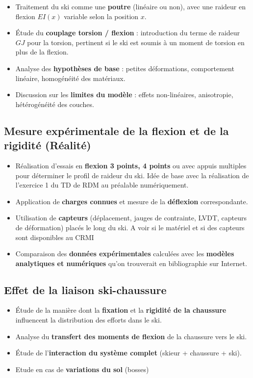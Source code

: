 \documentclass[12pt, a4paper]{article}
\begin{document}
\begin{itemize}
  \item Traitement du ski comme une \textbf{poutre} (linéaire ou non), avec une raideur en flexion $EI(x)$ variable selon la position $x$.
  \item Étude du \textbf{couplage torsion / flexion} : introduction du terme de raideur $GJ$ pour la torsion, pertinent si le ski est soumis à un moment de torsion en plus de la flexion.
  \item Analyse des \textbf{hypothèses de base} : petites déformations, comportement linéaire, homogénéité des matériaux.
  \item Discussion sur les \textbf{limites du modèle} : effets non-linéaires, anisotropie, hétérogénéité des couches.
\end{itemize}

\subsection{Mesure expérimentale de la flexion et de la rigidité (Réalité)}

\begin{itemize}
  \item Réalisation d'essais en \textbf{flexion 3 points, 4 points} ou avec appuis multiples pour déterminer le profil de raideur du ski. Idée de base avec la réalisation de l'exercice 1 du TD de RDM au préalable numériquement.
  \item Application de \textbf{charges connues} et mesure de la \textbf{déflexion} correspondante.
  \item Utilisation de \textbf{capteurs} (déplacement, jauges de contrainte, LVDT, capteurs de déformation) placés le long du ski. A voir si le matériel et si des capteurs sont disponibles au CRMI
  \item Comparaison des \textbf{données expérimentales} calculées avec les \textbf{modèles analytiques et numériques} qu'on trouverait en bibliographie sur Internet.
\end{itemize}

\subsection{Effet de la liaison ski-chaussure}

\begin{itemize}
  \item Étude de la manière dont la \textbf{fixation} et la \textbf{rigidité de la chaussure} influencent la distribution des efforts dans le ski.
  \item Analyse du \textbf{transfert des moments de flexion} de la chaussure vers le ski.
  \item Étude de l'\textbf{interaction du système complet} (skieur + chaussure + ski).
  \item   Etude en cas de \textbf{variations du sol} (bosses)
\end{itemize}
\end{document}
